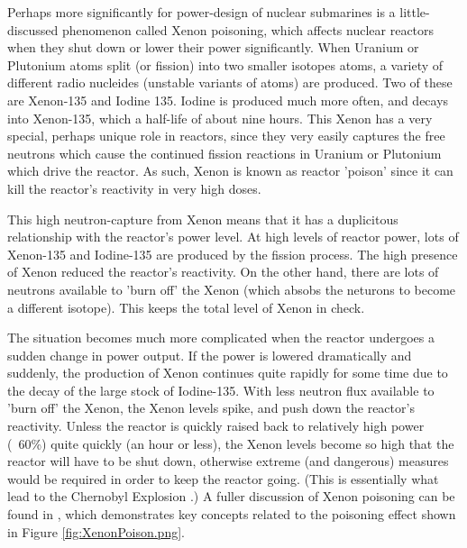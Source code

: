 \documentclass{article}\usepackage[]{graphicx}\usepackage[]{color}
\begin{document}
Perhaps more significantly for power-design of nuclear submarines is a little-discussed phenomenon called Xenon poisoning, which affects nuclear reactors when they shut down or lower their power significantly. When Uranium or Plutonium atoms split (or fission) into two smaller isotopes atoms, a variety of different radio nucleides (unstable variants of atoms) are produced.  Two of these are Xenon-135 and Iodine 135.  Iodine is produced much more often, and decays into Xenon-135, which a half-life of about nine hours.  This Xenon has a very special, perhaps unique role in reactors, since they very easily captures the free neutrons which cause the continued fission reactions in Uranium or Plutonium which drive the reactor.  As such, Xenon is known as reactor 'poison' since it can kill the reactor's reactivity in very high doses.

This high neutron-capture from Xenon means that it has a duplicitous relationship with the reactor's power level.  At high levels of reactor power, lots of Xenon-135 and Iodine-135 are produced by the fission process.  The high presence of Xenon reduced the reactor's reactivity.  On the other hand, there are lots of neutrons available to 'burn off' the Xenon (which absobs the neturons to become a different isotope).  This keeps the total level of Xenon in check.

The situation becomes much more complicated when the reactor undergoes a sudden change in power output.  If the power is lowered dramatically and suddenly, the production of Xenon continues quite rapidly for some time due to the decay of the large stock of Iodine-135.  With less neutron flux available to 'burn off' the Xenon, the Xenon levels spike, and push down the reactor's reactivity.  Unless the reactor is quickly raised back to relatively high power (~60\%) quite quickly (an hour or less), the Xenon levels become so high that the reactor will have to be shut down, otherwise extreme (and dangerous) measures would be required in order to keep the reactor going.  (This is essentially what lead to the Chernobyl Explosion \parencite{WNA2009}.)  A fuller discussion of Xenon poisoning can be found in \cite{garland2005}, which demonstrates key concepts related to the poisoning effect shown in Figure \ref{fig:XenonPoison.png}.
\end{document}
